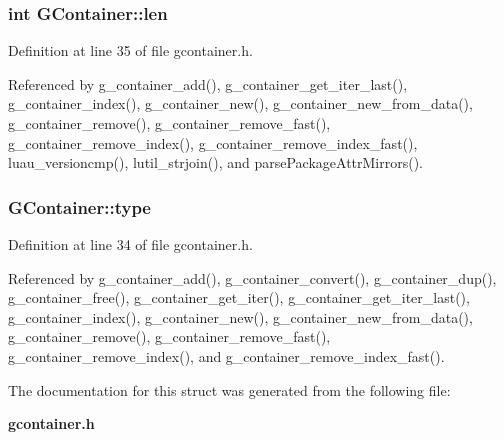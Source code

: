 \subsubsection{\setlength{\rightskip}{0pt plus 5cm}int {\bf GContainer::len}}\label{structGContainer_o1}




Definition at line 35 of file gcontainer.h.

Referenced by g\_\-container\_\-add(), g\_\-container\_\-get\_\-iter\_\-last(), g\_\-container\_\-index(), g\_\-container\_\-new(), g\_\-container\_\-new\_\-from\_\-data(), g\_\-container\_\-remove(), g\_\-container\_\-remove\_\-fast(), g\_\-container\_\-remove\_\-index(), g\_\-container\_\-remove\_\-index\_\-fast(), luau\_\-versioncmp(), lutil\_\-strjoin(), and parse\-Package\-Attr\-Mirrors().
\subsubsection{ {\bf GContainer::type}}\label{structGContainer_o0}




Definition at line 34 of file gcontainer.h.

Referenced by g\_\-container\_\-add(), g\_\-container\_\-convert(), g\_\-container\_\-dup(), g\_\-container\_\-free(), g\_\-container\_\-get\_\-iter(), g\_\-container\_\-get\_\-iter\_\-last(), g\_\-container\_\-index(), g\_\-container\_\-new(), g\_\-container\_\-new\_\-from\_\-data(), g\_\-container\_\-remove(), g\_\-container\_\-remove\_\-fast(), g\_\-container\_\-remove\_\-index(), and g\_\-container\_\-remove\_\-index\_\-fast().

The documentation for this struct was generated from the following file:\begin{CompactItemize}
\item 
{\bf gcontainer.h}\end{CompactItemize}
